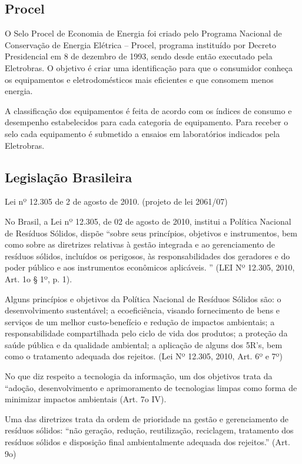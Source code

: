 \subsection{Procel}

O Selo Procel de Economia de Energia foi criado pelo Programa Nacional de Conservação de Energia Elétrica – Procel, programa instituído por Decreto Presidencial em 8 de dezembro de 1993, sendo desde então executado pela Eletrobras. O objetivo é criar uma identificação para que o consumidor conheça os equipamentos e eletrodomésticos mais eficientes e que consomem menos energia.

A classificação dos equipamentos é feita de acordo com os índices de consumo e desempenho estabelecidos para cada categoria de equipamento. Para receber o selo cada equipamento é submetido a ensaios em laboratórios indicados pela Eletrobras.


\subsection{Legislação Brasileira}

Lei nº 12.305 de 2 de agosto de 2010. (projeto de lei 2061/07)

No Brasil, a Lei nº 12.305, de 02 de agosto de 2010, institui a Política Nacional de Resíduos Sólidos, dispõe “sobre seus princípios, objetivos e instrumentos, bem como sobre as diretrizes relativas à gestão integrada e ao gerenciamento de resíduos sólidos, incluídos os perigosos, às responsabilidades dos geradores e do poder público e aos instrumentos econômicos aplicáveis. ” (LEI Nº 12.305, 2010, Art. 1o  § 1º, p. 1).

Alguns princípios e objetivos da Política Nacional de Resíduos Sólidos são: o desenvolvimento sustentável; a ecoeficiência, visando fornecimento de bens e serviços de um melhor custo-benefício e redução de impactos ambientais; a responsabilidade compartilhada pelo ciclo de vida dos produtos; a proteção da saúde pública e da qualidade ambiental; a aplicação de alguns dos 5R’s, bem como o tratamento adequada dos rejeitos. (Lei Nº 12.305, 2010, Art. 6º e 7º)

No que diz respeito a tecnologia da informação, um dos objetivos trata da “adoção, desenvolvimento e aprimoramento de tecnologias limpas como forma de minimizar impactos ambientais (Art. 7o IV).

Uma das diretrizes trata da ordem de prioridade na gestão e gerenciamento de resíduos sólidos: “não geração, redução, reutilização, reciclagem, tratamento dos resíduos sólidos e disposição final ambientalmente adequada dos rejeitos.” (Art. 9o)

